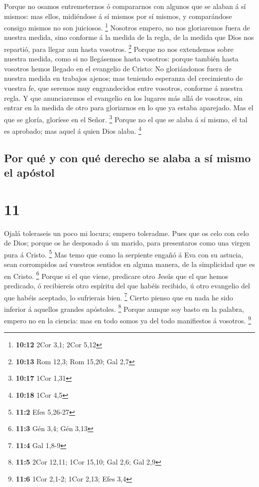  Porque no osamos entremeternos ó compararnos con algunos
que se alaban á sí mismos: mas ellos, midiéndose á sí mismos por sí
mismos, y comparándose consigo mismos no son juiciosos. \footnote{\textbf{10:12}
  2Cor 3,1; 2Cor 5,12}  Nosotros empero, no nos
gloriaremos fuera de nuestra medida, sino conforme á la medida de la
regla, de la medida que Dios nos repartió, para llegar aun hasta
vosotros. \footnote{\textbf{10:13} Rom 12,3; Rom 15,20; Gal 2,7}
 Porque no nos extendemos sobre nuestra medida, como si
no llegásemos hasta vosotros: porque también hasta vosotros hemos
llegado en el evangelio de Cristo:  No gloriándonos fuera
de nuestra medida en trabajos ajenos; mas teniendo esperanza del
crecimiento de vuestra fe, que seremos muy engrandecidos entre vosotros,
conforme á nuestra regla.  Y que anunciaremos el
evangelio en los lugares más allá de vosotros, sin entrar en la medida
de otro para gloriarnos en lo que ya estaba aparejado. 
Mas el que se gloría, gloríese en el Señor. \footnote{\textbf{10:17}
  1Cor 1,31}  Porque no el que se alaba á sí mismo, el
tal es aprobado; mas aquel á quien Dios alaba. \footnote{\textbf{10:18}
  1Cor 4,5}

\hypertarget{por-quuxe9-y-con-quuxe9-derecho-se-alaba-a-suxed-mismo-el-apuxf3stol}{%
\subsection{Por qué y con qué derecho se alaba a sí mismo el
apóstol}\label{por-quuxe9-y-con-quuxe9-derecho-se-alaba-a-suxed-mismo-el-apuxf3stol}}

\hypertarget{section-10}{%
\section{11}\label{section-10}}

 Ojalá toleraseis un poco mi locura; empero toleradme.
 Pues que os celo con celo de Dios; porque os he desposado
á un marido, para presentaros como una virgen pura á Cristo. \footnote{\textbf{11:2}
  Efes 5,26-27}  Mas temo que como la serpiente engañó á
Eva con su astucia, sean corrompidos así vuestros sentidos en alguna
manera, de la simplicidad que es en Cristo. \footnote{\textbf{11:3} Gén
  3,4; Gén 3,13}  Porque si el que viene, predicare otro
Jesús que el que hemos predicado, ó recibiereis otro espíritu del que
habéis recibido, ú otro evangelio del que habéis aceptado, lo sufrierais
bien. \footnote{\textbf{11:4} Gal 1,8-9}  Cierto pienso
que en nada he sido inferior á aquellos grandes apóstoles. \footnote{\textbf{11:5}
  2Cor 12,11; 1Cor 15,10; Gal 2,6; Gal 2,9}  Porque aunque
soy basto en la palabra, empero no en la ciencia: mas en todo somos ya
del todo manifiestos á vosotros. \footnote{\textbf{11:6} 1Cor 2,1-2;
  1Cor 2,13; Efes 3,4}

